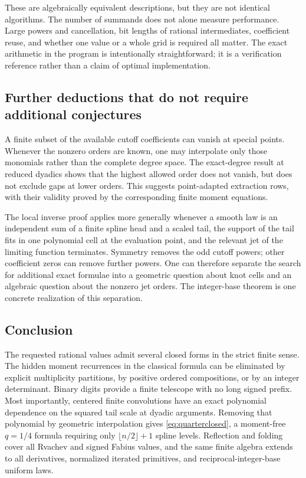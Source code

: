 \documentclass[11pt,oneside]{article}
\theoremstyle{definition}\newtheorem{definition}[theorem]{Definition}
\theoremstyle{remark}\newtheorem{remark}[theorem]{Remark}
\begin{document}
These are algebraically equivalent descriptions, but they are not identical
algorithms. The number of summands does not alone measure performance.
Large powers and cancellation, bit lengths of rational intermediates,
coefficient reuse, and whether one value or a whole grid is required all
matter. The exact arithmetic in the program is intentionally straightforward;
it is a verification reference rather than a claim of optimal implementation.

\subsection{Further deductions that do not require additional conjectures}
A finite subset of the available cutoff coefficients can vanish at special
points. Whenever the nonzero orders are known, one may interpolate only
those monomials rather than the complete degree space. The exact-degree
result at reduced dyadics shows that the highest allowed order does not
vanish, but does not exclude gaps at lower orders. This suggests
point-adapted extraction rows, with their validity proved by the corresponding
finite moment equations.

The local inverse proof applies more generally whenever a smooth law is an
independent sum of a finite spline head and a scaled tail, the support of the
tail fits in one polynomial cell at the evaluation point, and the relevant
jet of the limiting function terminates. Symmetry removes the odd cutoff
powers; other coefficient zeros can remove further powers. One can therefore
separate the search for additional exact formulae into a geometric question
about knot cells and an algebraic question about the nonzero jet orders.
The integer-base theorem is one concrete realization of this separation.

\subsection{Conclusion}
The requested rational values admit several closed forms in the strict
finite sense. The hidden moment recurrences in the classical formula can
be eliminated by explicit multiplicity partitions, by positive ordered
compositions, or by an integer determinant. Binary digits provide a finite
telescope with no long signed prefix. Most importantly, centered finite
convolutions have an exact polynomial dependence on the squared tail scale
at dyadic arguments. Removing that polynomial by geometric interpolation
gives \eqref{eq:quarterclosed}, a moment-free $q=1/4$ formula requiring
only $\lfloor n/2\rfloor+1$ spline levels. Reflection and folding cover all
Rvachev and signed Fabius values, and the same finite algebra extends to
all derivatives, normalized iterated primitives, and reciprocal-integer-base
uniform laws.
\end{document}
